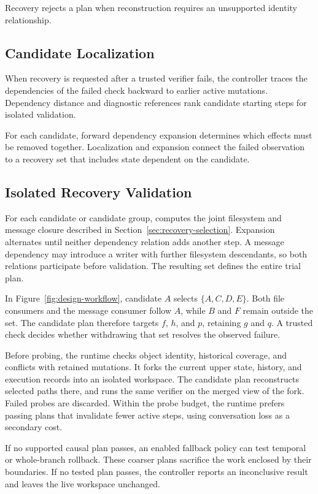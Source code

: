 Recovery rejects a plan when reconstruction requires an unsupported identity
relationship.

\subsection{Candidate Localization}

When recovery is requested after a trusted verifier fails, the controller
traces the dependencies of the failed check backward to earlier active mutations.
Dependency distance and diagnostic references rank candidate starting steps
for isolated validation.

For each candidate, forward dependency expansion determines which effects
must be removed together. Localization and expansion connect the failed
observation to a recovery set that includes state dependent on the candidate.

\subsection{Isolated Recovery Validation}

For each candidate or candidate group, \system computes the joint filesystem
and message closure described in Section~\ref{sec:recovery-selection}. Expansion
alternates until neither dependency relation adds another step. A message
dependency may introduce a writer with further filesystem descendants, so both
relations participate before validation. The resulting set defines the entire
trial plan.

In Figure~\ref{fig:design-workflow}, candidate $A$ selects $\{A,C,D,E\}$.
Both file consumers and the message consumer follow $A$, while $B$ and $F$
remain outside the set.
The candidate plan therefore targets $f$, $h$, and $p$, retaining $g$ and $q$.
A trusted check decides whether withdrawing that set resolves the observed
failure.

Before probing, the runtime checks object identity, historical coverage, and
conflicts with retained mutations.
It forks the current upper state, history, and execution records into an
isolated workspace.
The candidate plan reconstructs selected paths there, and \trycmd runs the same
verifier on the merged view of the fork.
Failed probes are discarded.
Within the probe budget, the runtime prefers passing plans that invalidate
fewer active steps, using conversation loss as a secondary cost.

If no supported causal plan passes, an enabled fallback policy
can test temporal or whole-branch rollback. These coarser plans sacrifice the
work enclosed by their boundaries. If no tested plan passes, the controller
reports an inconclusive result and leaves the live workspace unchanged.

